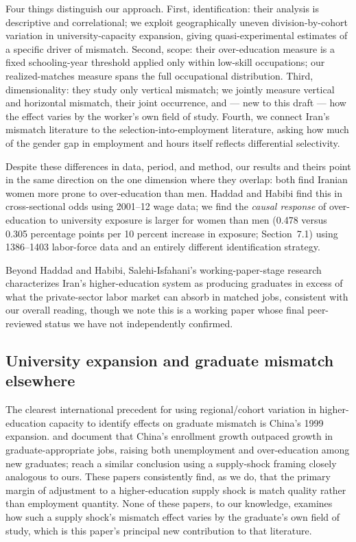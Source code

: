 \documentclass[11pt]{article}
\begin{document}
Four things distinguish our approach. First, identification: their analysis is descriptive and correlational; we exploit geographically uneven division-by-cohort variation in university-capacity expansion, giving quasi-experimental estimates of a specific driver of mismatch. Second, scope: their over-education measure is a fixed schooling-year threshold applied only within low-skill occupations; our realized-matches measure spans the full occupational distribution. Third, dimensionality: they study only vertical mismatch; we jointly measure vertical and horizontal mismatch, their joint occurrence, and --- new to this draft --- how the effect varies by the worker's own field of study. Fourth, we connect Iran's mismatch literature to the selection-into-employment literature, asking how much of the gender gap in employment and hours itself reflects differential selectivity.

Despite these differences in data, period, and method, our results and theirs point in the same direction on the one dimension where they overlap: both find Iranian women more prone to over-education than men. Haddad and Habibi find this in cross-sectional odds using 2001--12 wage data; we find the \emph{causal response} of over-education to university exposure is larger for women than men (0.478 versus 0.305 percentage points per 10 percent increase in exposure; Section~7.1) using 1386--1403 labor-force data and an entirely different identification strategy.

Beyond Haddad and Habibi, Salehi-Isfahani's working-paper-stage research characterizes Iran's higher-education system as producing graduates in excess of what the private-sector labor market can absorb in matched jobs, consistent with our overall reading, though we note this is a working paper whose final peer-reviewed status we have not independently confirmed.

\subsection{University expansion and graduate mismatch elsewhere}

The clearest international precedent for using regional/cohort variation in higher-education capacity to identify effects on graduate mismatch is China's 1999 expansion. \citet{li2014} and \citet{li2008} document that China's enrollment growth outpaced growth in graduate-appropriate jobs, raising both unemployment and over-education among new graduates; \citet{knight2017} reach a similar conclusion using a supply-shock framing closely analogous to ours. These papers consistently find, as we do, that the primary margin of adjustment to a higher-education supply shock is match quality rather than employment quantity. None of these papers, to our knowledge, examines how such a supply shock's mismatch effect varies by the graduate's own field of study, which is this paper's principal new contribution to that literature.
\end{document}
